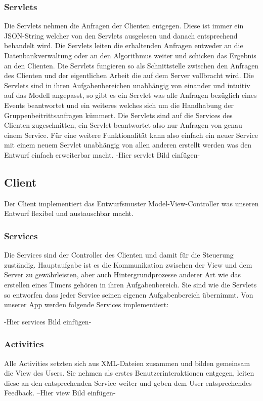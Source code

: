 	\subsubsection{Servlets}
	Die Servlets nehmen die Anfragen der Clienten entgegen. Diese ist immer ein JSON-String welcher von den Servlets ausgelesen und danach entsprechend behandelt wird. Die Servlets leiten die erhaltenden Anfragen entweder an die Datenbankverwaltung oder an den Algorithmus weiter und schicken das Ergebnis an den Clienten.
Die Servlets fungieren so als Schnittstelle zwischen den Anfragen des Clienten und der eigentlichen Arbeit die auf dem Server vollbracht wird. 
Die Servlets sind in ihren Aufgabenbereichen unabhängig von einander und intuitiv auf das Modell angepasst, so gibt es ein Servlet was alle Anfragen bezüglich eines Events beantwortet und ein weiteres welches sich um die Handhabung der Gruppenbeitrittsanfragen kümmert.
Die Servlets sind auf die Services des Clienten zugeschnitten, ein Servlet beantwortet also nur Anfragen von genau einem Service.
Für eine weitere Funktionalität kann also einfach ein neuer Service mit einem neuem Servlet unabhängig von allen anderen erstellt werden was den Entwurf einfach erweiterbar macht.   
-Hier servlet Bild einfügen-

	\subsection{Client}
	Der Client implementiert das Entwurfsmuster Model-View-Controller was unseren Entwurf flexibel und austauschbar macht.
	\subsubsection{Services}
	Die Services sind der Controller des Clienten und damit für die Steuerung zuständig. Hauptaufgabe ist es die Kommunikation zwischen der View und dem Server zu gewährleisten, aber auch Hintergrundprozesse anderer Art wie das erstellen eines Timers gehören in ihren Aufgabenbereich.
Sie sind wie die Servlets so entworfen dass jeder Service seinen eigenen Aufgabenbereich übernimmt.
Von unserer App werden folgende Services implementiert:

-Hier services Bild einfügen-

	\subsubsection{Activities}
	Alle Activities setzten sich aus XML-Dateien zusammen und bilden gemeinsam die View des Users.
Sie nehmen als erstes Benutzerinteraktionen entgegen, leiten diese an den entsprechenden Service weiter und geben dem User entsprechendes Feedback.
	--Hier view Bild einfügen-
